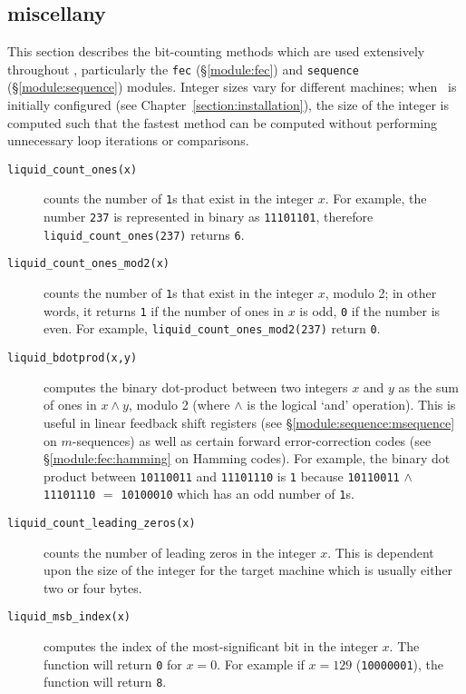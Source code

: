 \subsection{miscellany}
\label{module:utility:misc}
This section describes the bit-counting methods which are used extensively
throughout \liquid, particularly the
{\tt fec} (\S\ref{module:fec}) and
{\tt sequence} (\S\ref{module:sequence}) modules.
Integer sizes vary for different machines;
when \liquid\ is initially configured (see Chapter~\ref{section:installation}), the
size of the integer is computed such that the fastest method can be computed
without performing unnecessary loop iterations or comparisons.

\begin{description}
\item[{\tt liquid\_count\_ones(x)}]
    counts the number of {\tt 1}s that exist in the integer $x$.
    For example, the number {\tt 237} is represented in binary as
    {\tt 11101101}, therefore {\tt liquid\_count\_ones(237)} returns {\tt 6}.
\item[{\tt liquid\_count\_ones\_mod2(x)}]
    counts the number of {\tt 1}s that exist in the integer $x$, modulo 2; in
    other words, it returns {\tt 1} if the number of ones in $x$ is odd,
    {\tt 0} if the number is even.
    For example, {\tt liquid\_count\_ones\_mod2(237)} return {\tt 0}.
\item[{\tt liquid\_bdotprod(x,y)}]
    computes the binary dot-product between two integers $x$ and $y$ as the sum
    of ones in $x \land y$, modulo 2 (where $\land$ is the logical `and'
    operation).
    This is useful in linear feedback shift registers
    (see \S\ref{module:sequence:msequence} on $m$-sequences)
    as well as certain forward error-correction codes
    (see \S\ref{module:fec:hamming} on Hamming codes).
    For example, the binary dot product between
    {\tt 10110011} and
    {\tt 11101110} is
    {\tt 1} because
    {\tt 10110011} $\land$ {\tt 11101110} $=$ {\tt 10100010} which has an odd
    number of {\tt 1}s.
\item[{\tt liquid\_count\_leading\_zeros(x)}]
    counts the number of leading zeros in the integer $x$.
    This is dependent upon the size of the integer for the target machine
    which is usually either two or four bytes.
\item[{\tt liquid\_msb\_index(x)}]
    computes the index of the most-significant bit in the integer $x$.
    The function will return {\tt 0} for $x=0$.
    For example if $x=129$ ({\tt 10000001}), the function will return {\tt 8}.
\end{description}


